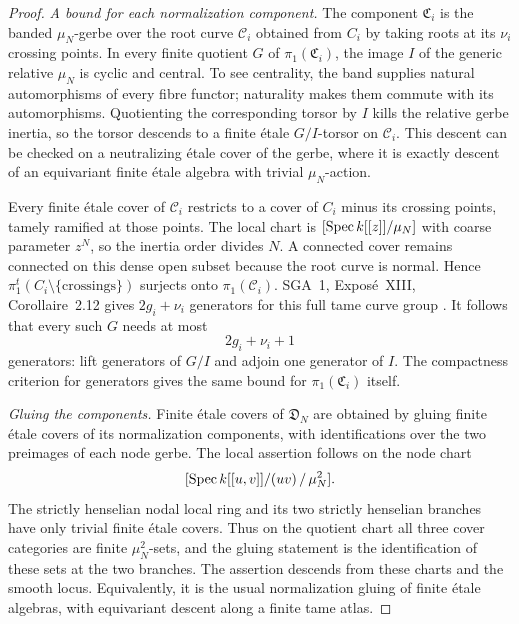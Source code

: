 \begin{proof}
\emph{A bound for each normalization component.}
The component $\mathfrak C_i$ is the banded $\mu_N$-gerbe over
the root curve $\mathcal C_i$ obtained from $C_i$ by taking roots
at its $\nu_i$ crossing points. In every finite quotient $G$ of
$\pi_1(\mathfrak C_i)$, the image $I$ of the generic relative
$\mu_N$ is cyclic and central. To see centrality, the band supplies
natural automorphisms of every fibre functor; naturality makes
them commute with its automorphisms. Quotienting the corresponding
torsor by $I$ kills the relative gerbe inertia, so the torsor
descends to a finite \'etale $G/I$-torsor on $\mathcal C_i$.
This descent can be checked on a neutralizing \'etale cover of the
gerbe, where it is exactly descent of an equivariant finite \'etale
algebra with trivial $\mu_N$-action.

Every finite \'etale cover of $\mathcal C_i$ restricts to a cover
of $C_i$ minus its crossing points, tamely ramified at those
points. The local chart is $[\operatorname{Spec} k[[z]]/\mu_N]$ with coarse
parameter $z^N$, so the inertia order divides $N$. A connected
cover remains connected on this dense open subset because the
root curve is normal. Hence
$\pi_1^t(C_i\setminus\{\text{crossings}\})$ surjects onto
$\pi_1(\mathcal C_i)$.
SGA~1, Expos\'e~XIII, Corollaire~2.12 gives $2g_i+\nu_i$
generators for this full tame curve group
\cite[original p.~392; retyped pp.~290--292]{SGA1TameCurves}.
It follows that every such $G$ needs at most
\[
                              2g_i+\nu_i+1               \tag{F9.3}
\]
generators: lift generators of $G/I$ and adjoin one generator of
$I$. The compactness criterion for generators gives the same bound
for $\pi_1(\mathfrak C_i)$ itself.

\emph{Gluing the components.}
Finite \'etale covers of $\mathfrak D_N$ are obtained by gluing
finite \'etale covers of its normalization components, with
identifications over the two preimages of each node gerbe.
The local assertion follows on the node chart
\[
 [\operatorname{Spec} k[[u,v]]/(uv)\,/\,\mu_N^2].
\]
The strictly henselian nodal local ring and its two strictly
henselian branches have only trivial finite \'etale covers. Thus
on the quotient chart all three cover categories are finite
$\mu_N^2$-sets, and the gluing statement is the identification
of these sets at the two branches. The assertion descends from
these charts and the smooth locus. Equivalently, it is the usual
normalization gluing of finite \'etale algebras, with equivariant
descent along a finite tame atlas.


\end{proof}
